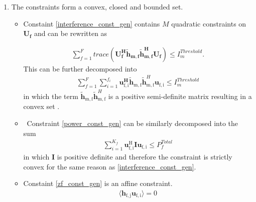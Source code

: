 \documentclass[12pt,a4paper]{report}
\begin{document}
\begin{enumerate}


\item
The constraints form a convex, closed and bounded set. 

\begin{itemize}

\item
	Constaint \eqref{interference_const_gen} contains $M$ quadratic constraints on $\mathbf{U_f}$ and 
	can be rewritten as 

\begin{gather*}
	\sum_{f=1}^F
	trace(\mathbf{U_f^H} \mathbf{\tilde{h}_{m,f}} \mathbf{\tilde{h}_{m,f}^H} \mathbf{U_f} )\leq 
	I^{Threshold}_{m}.
\end{gather*}
This can be further decomposed into  
	\begin{gather*}
	\sum_{f=1}^F
	\sum_{i=1}^{f_i}
	\mathbf{u_{\mathrm{f,i}}^H}\mathbf{\tilde{h}_{\mathrm{m,f}}} \mathbf{\tilde{h}}_{\mathrm{m,f}}^H
	\mathbf{u_{\mathrm{f,i}}} \leq I^{Threshold}_{m}
	\end{gather*}
in which the term $ \mathbf{\tilde{h}_{\mathrm{m,f}}} \mathbf{\tilde{h}}_{\mathrm{m,f}}^H$ is  a positive semi-definite matrix resulting in a convex set 
\cite[p.8,9]{BoV:04}. 


\item \
	Constraint \eqref{power_const_gen} can be similarly decomposed into the sum
	\begin{gather*}
		\sum_{i=1}^{K_f}\mathbf{u_{\mathrm{f,i}}^{\mathrm{H}}} \mathbf{I} 		
		\mathbf{u_{\mathrm{f,i}}} \leq  P^{Total}_{f}
	\end{gather*}
	in which $\mathbf{I}$ is positive definite and 			
	therefore the constraint is strictly convex for the same 		
	reason as \eqref{interference_const_gen}.

\item 
	Constaint \eqref{zf_const_gen} is an affine constraint. 
		\begin{gather*}
		\langle \mathbf{h_{\mathrm{f,j}}}\mathbf{u_{\mathrm{f,i}}} \rangle =0
		\end{gather*}
\end{itemize}



\end{enumerate}
\end{document}
